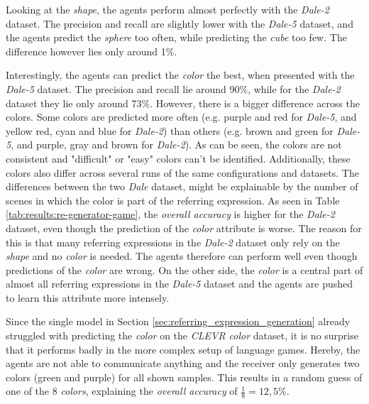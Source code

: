 Looking at the \emph{shape}, the agents perform almost perfectly with the \emph{Dale-2} dataset.
The precision and recall are slightly lower with the \emph{Dale-5} dataset, and the agents predict the \emph{sphere} too often, while predicting the \emph{cube} too few.
The difference however lies only around 1\%.

Interestingly, the agents can predict the \emph{color} the best, when presented with the \emph{Dale-5} dataset.
The precision and recall lie around 90\%, while for the \emph{Dale-2} dataset they lie only around 73\%.
However, there is a bigger difference across the colors.
Some colors are predicted more often (e.g. purple and red for \emph{Dale-5}, and yellow red, cyan and blue for \emph{Dale-2}) than others (e.g. brown and green for \emph{Dale-5}, and purple, gray and brown for \emph{Dale-2}).
As can be seen, the colors are not consistent and "difficult" or "easy" colors can't be identified.
Additionally, these colors also differ across several runs of the same configurations and datasets.
The differences between the two \emph{Dale} dataset, might be explainable by the number of scenes in which the color is part of the referring expression.
As seen in Table \ref{tab:results:re-generator-game}, the \emph{overall accuracy} is higher for the \emph{Dale-2} dataset, even though the prediction of the \emph{color} attribute is worse.
The reason for this is that many referring expressions in the \emph{Dale-2} dataset only rely on the \emph{shape} and no \emph{color} is needed.
The agents therefore can perform well even though predictions of the \emph{color} are wrong.
On the other side, the \emph{color} is a central part of almost all referring expressions in the \emph{Dale-5} dataset and the agents are pushed to learn this attribute more intensely.

Since the single model in Section \ref{sec:referring_expression_generation} already struggled with predicting the \emph{color} on the \emph{CLEVR color} dataset, it is no surprise that it performs badly in the more complex setup of language games.
Hereby, the agents are not able to communicate anything and the receiver only generates two colors (green and purple) for all shown samples.
This results in a random guess of one of the 8 \emph{colors}, explaining the \emph{overall accuracy} of $\frac{1}{8}=12,5\%$.

